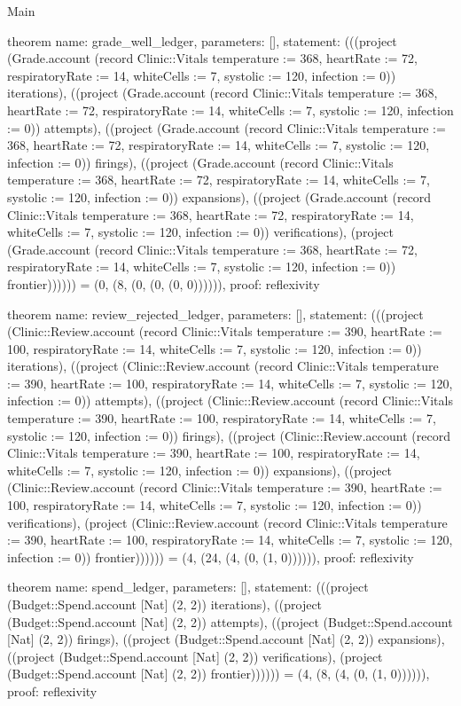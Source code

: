 \begin{lexlean}{Main}
\begin{semanticmodule}
theorem{
  name: grade_well_ledger,
  parameters: [],
  statement: (((project (Grade.account (record Clinic::Vitals {temperature := 368, heartRate := 72, respiratoryRate := 14, whiteCells := 7, systolic := 120, infection := 0})) iterations), ((project (Grade.account (record Clinic::Vitals {temperature := 368, heartRate := 72, respiratoryRate := 14, whiteCells := 7, systolic := 120, infection := 0})) attempts), ((project (Grade.account (record Clinic::Vitals {temperature := 368, heartRate := 72, respiratoryRate := 14, whiteCells := 7, systolic := 120, infection := 0})) firings), ((project (Grade.account (record Clinic::Vitals {temperature := 368, heartRate := 72, respiratoryRate := 14, whiteCells := 7, systolic := 120, infection := 0})) expansions), ((project (Grade.account (record Clinic::Vitals {temperature := 368, heartRate := 72, respiratoryRate := 14, whiteCells := 7, systolic := 120, infection := 0})) verifications), (project (Grade.account (record Clinic::Vitals {temperature := 368, heartRate := 72, respiratoryRate := 14, whiteCells := 7, systolic := 120, infection := 0})) frontier)))))) = (0, (8, (0, (0, (0, 0)))))),
  proof: reflexivity{}
}

theorem{
  name: review_rejected_ledger,
  parameters: [],
  statement: (((project (Clinic::Review.account (record Clinic::Vitals {temperature := 390, heartRate := 100, respiratoryRate := 14, whiteCells := 7, systolic := 120, infection := 0})) iterations), ((project (Clinic::Review.account (record Clinic::Vitals {temperature := 390, heartRate := 100, respiratoryRate := 14, whiteCells := 7, systolic := 120, infection := 0})) attempts), ((project (Clinic::Review.account (record Clinic::Vitals {temperature := 390, heartRate := 100, respiratoryRate := 14, whiteCells := 7, systolic := 120, infection := 0})) firings), ((project (Clinic::Review.account (record Clinic::Vitals {temperature := 390, heartRate := 100, respiratoryRate := 14, whiteCells := 7, systolic := 120, infection := 0})) expansions), ((project (Clinic::Review.account (record Clinic::Vitals {temperature := 390, heartRate := 100, respiratoryRate := 14, whiteCells := 7, systolic := 120, infection := 0})) verifications), (project (Clinic::Review.account (record Clinic::Vitals {temperature := 390, heartRate := 100, respiratoryRate := 14, whiteCells := 7, systolic := 120, infection := 0})) frontier)))))) = (4, (24, (4, (0, (1, 0)))))),
  proof: reflexivity{}
}

theorem{
  name: spend_ledger,
  parameters: [],
  statement: (((project (Budget::Spend.account [Nat] (2, 2)) iterations), ((project (Budget::Spend.account [Nat] (2, 2)) attempts), ((project (Budget::Spend.account [Nat] (2, 2)) firings), ((project (Budget::Spend.account [Nat] (2, 2)) expansions), ((project (Budget::Spend.account [Nat] (2, 2)) verifications), (project (Budget::Spend.account [Nat] (2, 2)) frontier)))))) = (4, (8, (4, (0, (1, 0)))))),
  proof: reflexivity{}
}


\end{semanticmodule}
\end{lexlean}
